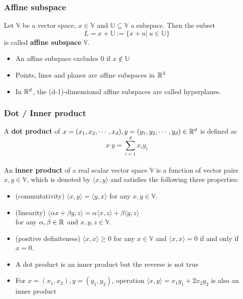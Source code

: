 \begin{frame}\frametitle{Affine subspace}
    Let $\mathbb{V}$ be a vector space, $x \in \mathbb{V}$ and $\mathbb{U}\subseteq\mathbb{V}$ a subspace. Then the subset
    \begin{equation*}
        L = x + \mathbb{U} := \{x+u|\ u\in\mathbb{U}\}
    \end{equation*}
    is called \textbf{affine subspace} $\mathbb{V}$.
    \vspace*{5mm}
    \begin{itemize}
        \item An affine subspace excludes 0 if $x \notin \mathbb{U}$
        \item Points, lines and planes are affine subspaces in ${\mathbb R}^{3}$
        \item In ${\mathbb R}^{d}$, the (d-1)-dimensional affine subspaces are called hyperplanes.
    \end{itemize}
\end{frame}


\begin{frame}\frametitle{Dot / Inner product}
    A \textbf{dot product} of $x=(x_1,x_2,\cdots,x_d), y=(y_1,y_2,\cdots,y_d) \in{\mathbb R}^{d}$ is defined as
    \begin{equation*}
        x\boldsymbol{\cdot}y = \sum_{i=1}^dx_iy_i
    \end{equation*}\\

    \pause An \textbf{inner product} of a real scalar vector space $\mathbb{V}$ is a function of vector pairs $x,y\in\mathbb{V}$,  which is denoted by $\langle x,y\rangle$ and
    satisfies the following three properties:
    \begin{itemize}
        \item (commutativity) $\langle x,y\rangle = \langle y,x\rangle$ for any $x,y\in\mathbb{V}$.
        \item (linearity) $\langle \alpha x+\beta y, z\rangle = \alpha\langle x, z\rangle + \beta\langle y, z\rangle$ \\for any $\alpha,\beta \in{\mathbb R}^{}$ and $x,y,z \in\mathbb{V}$.
        \item (positive definiteness) $\langle x,x \rangle \geq 0$ for any $x \in\mathbb{V}$ and $\langle x,x \rangle =0$ if and only if $x = 0$.
    \end{itemize}
    \vspace*{3mm}
    \pause\begin{itemize}
        \setlength{\itemindent}{-1em}
        \item A dot product is an inner product but the reverse is not true
        \item For $x=(x_1, x_2), y=(y_1, y_2)$, operation $\langle x,y \rangle=x_1y_1+2x_2y_2$ is also an inner product 
      \end{itemize}    
\end{frame}

